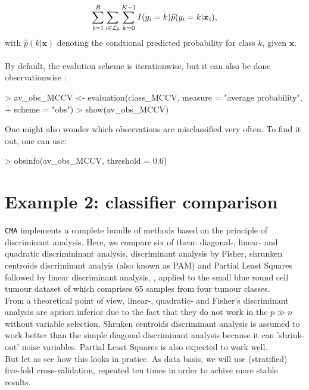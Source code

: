 \begin{equation*}
\sum_{b=1}^B \sum_{i \in \mathcal L_b}  \sum_{k=0}^{K-1} I(y_i = k) \widehat{p}(y_i = k | \bm{x}_i), 
\end{equation*}
with $\widehat{p}(k|\bm{x})$ denoting the condtional predicted probability for class $k$,
given $\bm{x}$.\\
\\ 
By default, the evalution scheme is iterationwise, but it can also be done
observationwise :

\begin{Schunk}
\begin{Sinput}
> av_obs_MCCV <- evaluation(class_MCCV, measure = "average probability", 
+     scheme = "obs")
> show(av_obs_MCCV)
\end{Sinput}
\end{Schunk}

One might also wonder which observations are misclassified very often. To find
it out, one can use:

\begin{Schunk}
\begin{Sinput}
> obsinfo(av_obs_MCCV, threshold = 0.6)
\end{Sinput}
\end{Schunk}

\section{Example 2: classifier comparison}\label{sec:ex2}

\texttt{CMA} implements a complete bundle of methods based on the principle of
discriminant analysis. Here, we compare six of them:
diagonal-, linear- and quadratic discrimininant analysis, discriminant
analysis by Fisher, shrunken centroids discriminant analyis (also known
as PAM) and Partial Least Squares followed by linear discriminant analysis, 
, applied to the small blue round cell tumour dataset of \citet{Khan2001}
which comprises 65 samples from four tumour classes.\\ 
From a theoretical point of view, linear-, quadratic- and Fisher's discriminant
analysis are apriori inferior due to the fact that they do not work in the
$p \gg n$ without variable selection. Shruken centroids discriminant analysis
is assumed to work better than the simple diagonal discriminant analysis because
it can 'shrink-out' noise variables. Partial Least Squares is also expected to
work well.\\
But let as see how this looks in pratice. As data basis, we will use
(stratified) five-fold cross-validation, repeated ten times in order to
achive more stable results. 


